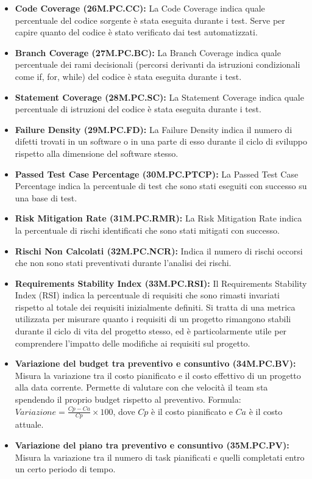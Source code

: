 \begin{itemize}
    \item \textbf{Code Coverage (26M.PC.CC):} La Code Coverage indica quale percentuale del codice sorgente è stata eseguita durante i test. Serve per capire quanto del codice è stato verificato dai test automatizzati.
    \item \textbf{Branch Coverage (27M.PC.BC):} La Branch Coverage indica quale percentuale dei rami decisionali (percorsi derivanti da istruzioni condizionali come if, for, while) del codice è stata eseguita durante i test.
    \item \textbf{Statement Coverage (28M.PC.SC):} La Statement Coverage indica quale percentuale di istruzioni del codice è stata eseguita durante i test.
    \item \textbf{Failure Density (29M.PC.FD):} La Failure Density indica il numero di difetti trovati in un software o in una parte di esso durante il ciclo di sviluppo rispetto alla dimensione del software stesso.
    \item \textbf{Passed Test Case Percentage (30M.PC.PTCP):} La Passed Test Case Percentage indica la percentuale di test che sono stati eseguiti con successo su una base di test.
    \item \textbf{Risk Mitigation Rate (31M.PC.RMR):} La Risk Mitigation Rate indica la percentuale di rischi identificati che sono stati mitigati con successo.
    \item \textbf{Rischi Non Calcolati (32M.PC.NCR):} Indica il numero di rischi occorsi che non sono stati preventivati durante l’analisi dei rischi.
    \item \textbf{Requirements Stability Index (33M.PC.RSI):} Il Requirements Stability Index (RSI) indica la percentuale di requisiti che sono rimasti invariati rispetto al totale dei requisiti inizialmente definiti. Si tratta di una metrica utilizzata per misurare quanto i requisiti di un progetto rimangono stabili durante il ciclo di vita del progetto stesso, ed è particolarmente utile per comprendere l’impatto delle modifiche ai requisiti sul progetto.
    \item \textbf{Variazione del budget tra preventivo e consuntivo (34M.PC.BV):} Misura la variazione tra il costo pianificato e il costo effettivo di un progetto alla data corrente. Permette di valutare con che velocità il team sta spendendo il proprio budget rispetto al preventivo. Formula: $Variazione = \frac{Cp - Ca}{Cp} \times 100$, dove $Cp$ è il costo pianificato e $Ca$ è il costo attuale.
    \item \textbf{Variazione del piano tra preventivo e consuntivo (35M.PC.PV):} Misura la variazione tra il numero di task pianificati e quelli completati entro un certo periodo di tempo.
\end{itemize}


